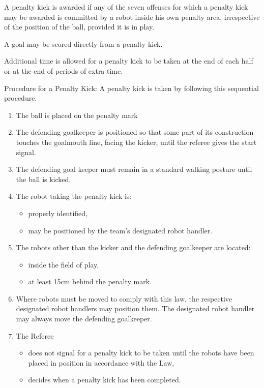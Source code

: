 \documentclass[12pt]{hurocup}
\begin{document}
\begin{lawlist}
  
\item A penalty kick is awarded if any of the seven offenses for which
  a penalty kick may be awarded is committed by a robot inside his own
  penalty area, irrespective of the position of the ball, provided it
  is in play.
  
\item A goal may be scored directly from a penalty kick.
  
\item Additional time is allowed for a penalty kick to be taken at the
  end of each half or at the end of periods of extra time.
  
\item Procedure for a Penalty Kick: A penalty kick is taken by
  following this sequential procedure.
  \begin{enumerate}
  \item The ball is placed on the penalty mark
  \item  The defending goalkeeper is positioned so that some part of
    its construction touches the goalmouth line, facing the kicker,
    until the referee gives the start signal.
  \item The defending goal keeper must remain in a standard walking
    posture until the ball is kicked.
  \item The robot taking the penalty kick is: 
    \begin{itemize}
    \item properly identified,
    \item may be positioned by the team's designated robot handler.
    \end{itemize}
  \item The robots other than the kicker and the defending goalkeeper
    are located:
    \label{pk-other-players}
    \begin{itemize}
    \item inside the field of play,
    \item at least 15cm behind the penalty mark.
    \end{itemize}
 \item Where robots must be moved to comply with this law, the
   respective designated robot handlers may position them. The
   designated robot handler may always move the defending goalkeeper. 
 \item The Referee
   \begin{itemize}
   \item does not signal for a penalty kick to be taken until the
     robots have been placed in position in accordance with the Law,
   \item decides when a penalty kick has been completed.
   \end{itemize}
 \end{enumerate}   


\end{lawlist}
\end{document}
